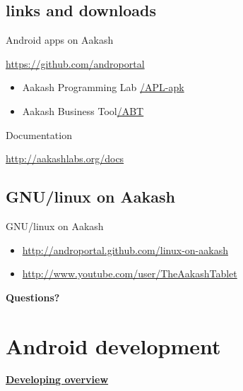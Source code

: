 \documentclass{beamer}
\begin{document}
 \subsection{links and downloads}
 \begin{frame}{Android apps on Aakash}
   \begin{block}{\url{https://github.com/androportal}}
     \begin{itemize}
       \item Aakash Programming Lab \hfill \url{/APL-apk}
       \item Aakash Business Tool\hfill \url{/ABT}
     \end{itemize}
   \end{block}
   \begin{block}{Documentation}
       \centerline{\url {http://aakashlabs.org/docs}}
   \end{block}
 \end{frame}

 \subsection{GNU/linux on Aakash}
 \begin{frame}{GNU/linux on Aakash}
   \begin{block}{}
     \begin{itemize}
     \item \url{http://androportal.github.com/linux-on-aakash}
     \item \url{http://www.youtube.com/user/TheAakashTablet}
     \end{itemize}
   \end{block}
 \end{frame}

 \begin{frame}{}
   \centerline{\bf Questions?}
 \end{frame}

 \section{Android development}

 \begin{frame}
 \begin{center}
   \centerline{\href{file:///opt/aakashdemo/developing_overview.svg}{\bf
   Developing overview}}
 \end{center}  
 \end{frame}
\end{document}
